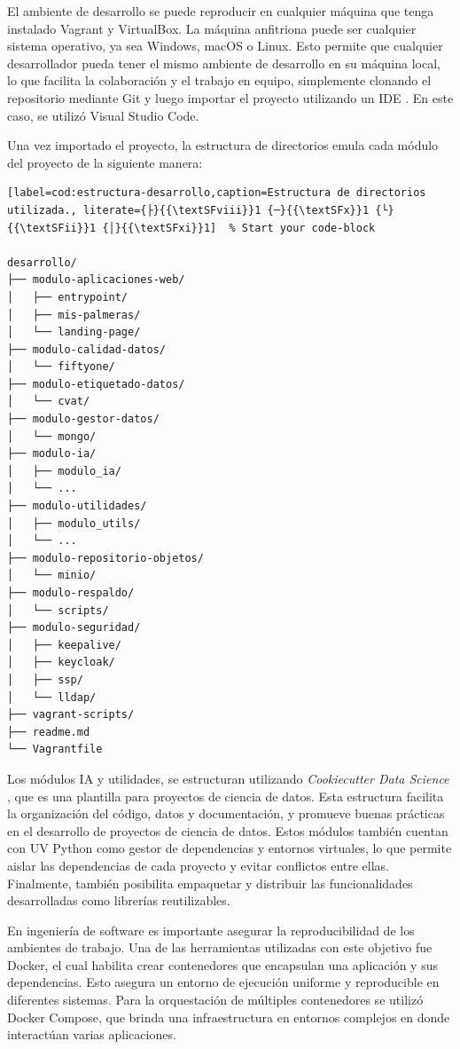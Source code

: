 El ambiente de desarrollo se puede reproducir en cualquier máquina que tenga instalado Vagrant y VirtualBox. La máquina anfitriona puede ser cualquier sistema operativo, ya sea Windows, macOS o Linux. Esto permite que cualquier desarrollador pueda tener el mismo ambiente de desarrollo en su máquina local, lo que facilita la colaboración y el trabajo en equipo, simplemente clonando el repositorio \citep{bruno_masoller_brunomaso1uba-ceia_nodate} mediante Git y luego importar el proyecto utilizando un IDE \citep{wikipedia_entorno_2025}. En este caso, se utilizó Visual Studio Code.

Una vez importado el proyecto, la estructura de directorios emula cada módulo del proyecto de la siguiente manera:

\begin{lstlisting}[label=cod:estructura-desarrollo,caption=Estructura de directorios utilizada., literate={├}{{\textSFviii}}1 {─}{{\textSFx}}1 {└}{{\textSFii}}1 {│}{{\textSFxi}}1]  % Start your code-block

desarrollo/
├── modulo-aplicaciones-web/
│   ├── entrypoint/ 
│   ├── mis-palmeras/
│   └── landing-page/
├── modulo-calidad-datos/
│   └── fiftyone/
├── modulo-etiquetado-datos/
│   └── cvat/
├── modulo-gestor-datos/
│   └── mongo/
├── modulo-ia/
│   ├── modulo_ia/
│   └── ...
├── modulo-utilidades/
│   ├── modulo_utils/
│   └── ...
├── modulo-repositorio-objetos/
│   └── minio/
├── modulo-respaldo/
│   └── scripts/
├── modulo-seguridad/
│   ├── keepalive/
│   ├── keycloak/
│   ├── ssp/
│   └── lldap/
├── vagrant-scripts/
├── readme.md
└── Vagrantfile

\end{lstlisting}

Los módulos IA y utilidades, se estructuran utilizando \textit{Cookiecutter Data Science} \citep{drivendata_cookiecutter_nodate}, que es una plantilla para proyectos de ciencia de datos. Esta estructura facilita la organización del código, datos y documentación,  y promueve buenas prácticas en el desarrollo de proyectos de ciencia de datos. Estos módulos también cuentan con UV Python como gestor de dependencias y entornos virtuales, lo que permite aislar las dependencias de cada proyecto y evitar conflictos entre ellas. Finalmente, también posibilita empaquetar y distribuir las funcionalidades desarrolladas como librerías reutilizables.

En ingeniería de software es importante asegurar la reproducibilidad de los ambientes de trabajo. Una de las herramientas utilizadas con este objetivo fue Docker, el cual habilita crear contenedores que encapsulan una aplicación y sus dependencias. Esto asegura un entorno de ejecución uniforme y reproducible en diferentes sistemas. Para la orquestación de múltiples contenedores se utilizó Docker Compose, que brinda una infraestructura en entornos complejos en donde interactúan varias aplicaciones.


